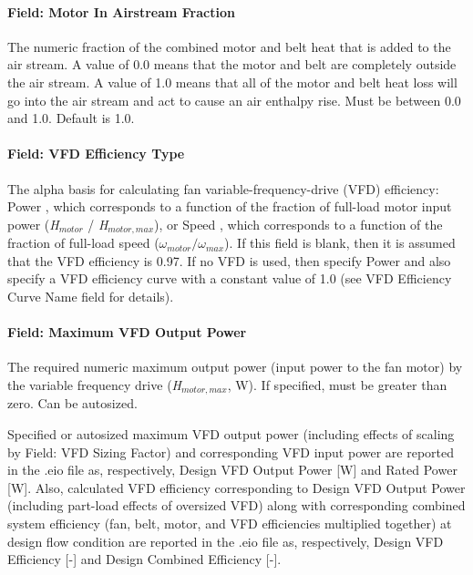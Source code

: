 \paragraph{Field: Motor In Airstream Fraction}\label{field-motor-in-airstream-fraction-4}

The numeric fraction of the combined motor and belt heat that is added to the air stream. A value of 0.0 means that the motor and belt are completely outside the air stream. A value of 1.0 means that all of the motor and belt heat loss will go into the air stream and act to cause an air enthalpy rise. Must be between 0.0 and 1.0. Default is 1.0.

\paragraph{Field: VFD Efficiency Type}\label{field-vfd-efficiency-type}

The alpha basis for calculating fan variable-frequency-drive (VFD) efficiency: Power , which corresponds to a function of the fraction of full-load motor input power (\emph{H\(_{motor}\)} / \emph{H\(_{motor,max}\)}), or Speed , which corresponds to a function of the fraction of full-load speed (\(\omega_{motor} / \omega_{max}\)). If this field is blank, then it is assumed that the VFD efficiency is 0.97. If no VFD is used, then specify Power and also specify a VFD efficiency curve with a constant value of 1.0 (see VFD Efficiency Curve Name field for details).

\paragraph{Field: Maximum VFD Output Power}\label{field-maximum-vfd-output-power}

The required numeric maximum output power (input power to the fan motor) by the variable frequency drive (\emph{H\(_{motor,max}\)}, W). If specified, must be greater than zero. Can be autosized.

Specified or autosized maximum VFD output power (including effects of scaling by Field: VFD Sizing Factor) and corresponding VFD input power are reported in the .eio file as, respectively, Design VFD Output Power {[}W{]} and Rated Power {[}W{]}. Also, calculated VFD efficiency corresponding to Design VFD Output Power (including part-load effects of oversized VFD) along with corresponding combined system efficiency (fan, belt, motor, and VFD efficiencies multiplied together) at design flow condition are reported in the .eio file as, respectively, Design VFD Efficiency {[}-{]} and Design Combined Efficiency {[}-{]}.

